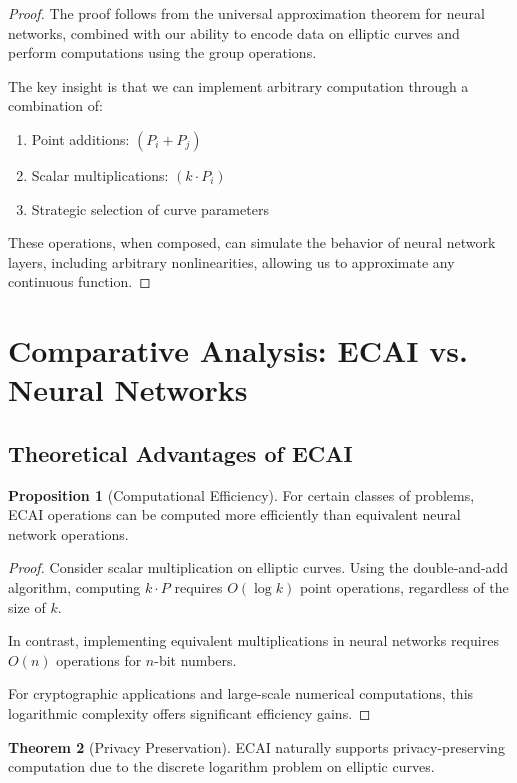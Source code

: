 \documentclass[12pt,a4paper]{article}
\theoremstyle{definition}
\newtheorem{theorem}{Theorem}
\newtheorem{proposition}[theorem]{Proposition}
\begin{document}
\begin{proof}
The proof follows from the universal approximation theorem for neural networks, combined with our ability to encode data on elliptic curves and perform computations using the group operations.

The key insight is that we can implement arbitrary computation through a combination of:
\begin{enumerate}
\item Point additions: $(P_i + P_j)$
\item Scalar multiplications: $(k \cdot P_i)$
\item Strategic selection of curve parameters
\end{enumerate}

These operations, when composed, can simulate the behavior of neural network layers, including arbitrary nonlinearities, allowing us to approximate any continuous function.
\end{proof}

\section{Comparative Analysis: ECAI vs. Neural Networks}

\subsection{Theoretical Advantages of ECAI}

\begin{proposition}[Computational Efficiency]
For certain classes of problems, ECAI operations can be computed more efficiently than equivalent neural network operations.
\end{proposition}

\begin{proof}
Consider scalar multiplication on elliptic curves. Using the double-and-add algorithm, computing $k \cdot P$ requires $O(\log k)$ point operations, regardless of the size of $k$.

In contrast, implementing equivalent multiplications in neural networks requires $O(n)$ operations for $n$-bit numbers.

For cryptographic applications and large-scale numerical computations, this logarithmic complexity offers significant efficiency gains.
\end{proof}

\begin{theorem}[Privacy Preservation]
ECAI naturally supports privacy-preserving computation due to the discrete logarithm problem on elliptic curves.
\end{theorem}
\end{document}
